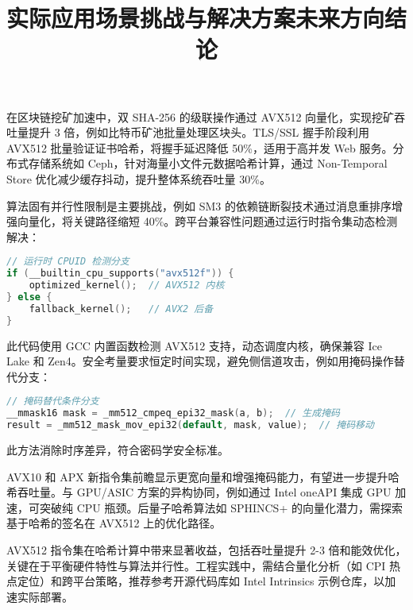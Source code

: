 \title{实际应用场景}
在区块链挖矿加速中，双 SHA-256 的级联操作通过 AVX512 向量化，实现挖矿吞吐量提升 3 倍，例如比特币矿池批量处理区块头。TLS/SSL 握手阶段利用 AVX512 批量验证证书哈希，将握手延迟降低 50\%{}，适用于高并发 Web 服务。分布式存储系统如 Ceph，针对海量小文件元数据哈希计算，通过 Non-Temporal Store 优化减少缓存抖动，提升整体系统吞吐量 30\%{}。\par
\title{挑战与解决方案}
算法固有并行性限制是主要挑战，例如 SM3 的依赖链断裂技术通过消息重排序增强向量化，将关键路径缩短 40\%{}。跨平台兼容性问题通过运行时指令集动态检测解决：\par
\begin{lstlisting}[language=c]
// 运行时 CPUID 检测分支
if (__builtin_cpu_supports("avx512f")) {
    optimized_kernel();  // AVX512 内核
} else {
    fallback_kernel();   // AVX2 后备
}
\end{lstlisting}
此代码使用 GCC 内置函数检测 AVX512 支持，动态调度内核，确保兼容 Ice Lake 和 Zen4。安全考量要求恒定时间实现，避免侧信道攻击，例如用掩码操作替代分支：\par
\begin{lstlisting}[language=c]
// 掩码替代条件分支
__mmask16 mask = _mm512_cmpeq_epi32_mask(a, b);  // 生成掩码
result = _mm512_mask_mov_epi32(default, mask, value);  // 掩码移动
\end{lstlisting}
此方法消除时序差异，符合密码学安全标准。\par
\title{未来方向}
AVX10 和 APX 新指令集前瞻显示更宽向量和增强掩码能力，有望进一步提升哈希吞吐量。与 GPU/ASIC 方案的异构协同，例如通过 Intel oneAPI 集成 GPU 加速，可突破纯 CPU 瓶颈。后量子哈希算法如 SPHINCS+ 的向量化潜力，需探索基于哈希的签名在 AVX512 上的优化路径。\par
\title{结论}
AVX512 指令集在哈希计算中带来显著收益，包括吞吐量提升 2-3 倍和能效优化，关键在于平衡硬件特性与算法并行性。工程实践中，需结合量化分析（如 CPI 热点定位）和跨平台策略，推荐参考开源代码库如 Intel Intrinsics 示例仓库，以加速实际部署。\par
